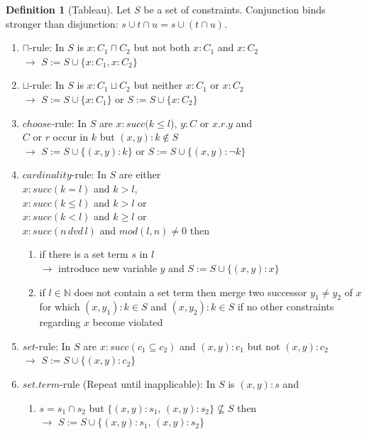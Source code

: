 \documentclass[a4paper,11pt]{scrartcl}
\theoremstyle{definition}
\newtheorem{mydef}{Definition}
\begin{document}
\begin{mydef}[Tableau]
Let $S$ be a set of constraints. Conjunction binds stronger than disjunction: $s\cup t\cap u = s\cup (t\cap u)$.
\begin{enumerate}
\item\label{cap} $\sqcap$-rule: In $S$ is $x:C_1\sqcap C_2$ but not both $x:C_1$ and $x:C_2$\\
$\rightarrow$ $S:=S\cup\{x:C_1, x:C_2\}$
\item\label{cup} $\sqcup$-rule: In $S$ is $x:C_1\sqcup C_2$ but neither $x:C_1$ or $x:C_2$\\
$\rightarrow$ $S:=S\cup\{x:C_1\}$ or $S:=S\cup\{x:C_2\}$
\item\label{choose}$choose$-rule: In $S$ are
$x:succ(k\leq l$), $y:C$ or $x.r.y$ and\\ $C$ or $r$ occur in $k$ but $(x,y):k\not\in S$\\
$\rightarrow$ $S:=S\cup\{(x,y):k\}$ or $S:=S\cup\{(x,y):\neg k\}$
\item\label{c}$cardinality$-rule: In $S$ are either \\$x:succ(k=l)$ and $k>l$, \\$x:succ(k\leq l)$ and $k>l$ or\\$x:succ(k<l)$ and $k\geq l$ or\\$x:succ(n\,dvd\,l)$ and $mod(l,n)\neq 0$ then
\begin{enumerate}
\item \label{setterm} if there is a set term $s$ in $l$\\
$\rightarrow$ introduce new variable $y$ and $S:=S\cup\{(x,y):x\}$
\item \label{exceeded} if $l\in \mathbb{N}$ does not contain a set term then merge two successor $y_1\neq y_2$ of $x$ for which $(x,y_1):k\in S$ and $(x,y_2):k\in S$ if no other constraints regarding $x$ become violated
\end{enumerate}
\item\label{s}$set$-rule: In $S$ are $x:succ(c_1\subseteq c_2)$ and $(x,y):c_1$ but not $(x,y):c_2$\\
$\rightarrow$ $S:=S\cup\{(x,y):c_2\}$
\item\label{repeat} $set.term$-rule (Repeat until inapplicable): In $S$ is $(x,y):s$ and
\begin{enumerate}
\item\label{setterm1} $s=s_1\cap s_2$ but $\{(x,y):s_1,\,(x,y):s_2\}\not\subseteq S$ then\\
$\rightarrow$ $S:=S\cup \{(x,y):s_1,\,(x,y):s_2\}$ 

\end{enumerate}
\end{enumerate}
\end{mydef}
\end{document}
